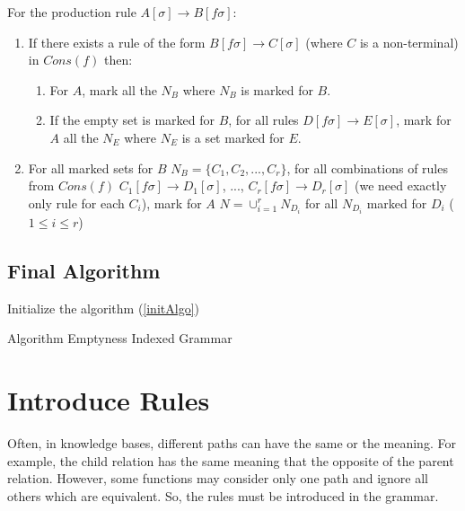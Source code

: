 \documentclass[10pt,a4paper,draft]{article}
\begin{document}
For the production rule $A[\sigma] \rightarrow B[f \sigma]$:
\begin{enumerate}
\item If there exists a rule of the form $B[f \sigma] \rightarrow C[\sigma]$ (where $C$ is a non-terminal) in $Cons(f)$ then:
\begin{enumerate}
\item For $A$, mark all the $N_B$ where $N_B$ is marked for $B$.
\item If the empty set is marked for $B$, for all rules $D[f \sigma] \rightarrow E[\sigma]$, mark for $A$ all the $N_E$ where $N_E$ is a set marked for $E$.
\end{enumerate}
\item For all marked sets for $B$ $N_B = \{C_1, C_2, ..., C_r\}$, for all combinations of rules from $Cons(f)$ $C_1[f \sigma] \rightarrow D_1[\sigma]$, ..., $C_r[f \sigma] \rightarrow D_r[\sigma]$ (we need exactly only rule for each $C_i$), mark for $A$ $N = \cup_{i=1}^{r} N_{D_i}$ for all $N_{D_i}$ marked for $D_i$ ($1 \leq i \leq r$)
\end{enumerate}

\subsection{Final Algorithm}

\begin{algorithm}[H]
\SetAlgoLined
{}
Initialize the algorithm (\ref{initAlgo})\;
 \caption{Algorithm Emptyness Indexed Grammar}
 \label{algoEmptyness}
\end{algorithm}

\section{Introduce Rules}

Often, in knowledge bases, different paths can have the same or the meaning. For example, the child relation has the same meaning that the opposite of the parent relation. However, some functions may consider only one path and ignore all others which are equivalent. So, the rules must be introduced in the grammar.
\end{document}
